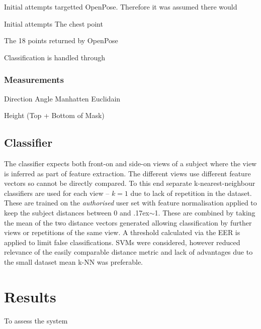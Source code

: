 \documentclass[conference]{IEEEtran} %
\newcommand{\mytilde}{\raise.17ex\hbox{$\scriptstyle\mathtt{\sim}$}}
\begin{document}
Initial attempts targetted OpenPose. Therefore it was assumed there would

Initial attempts 
The chest point 

The 18 points returned by OpenPose




Classification is handled through 

\subsubsection{Measurements}
Direction
Angle
Manhatten
Euclidain

Height (Top + Bottom of Mask)

\subsection{Classifier}
\noindent The classifier expects both front-on and side-on views of a subject where the view is inferred as part of feature extraction. The different views use different feature vectors so cannot be directly compared. To this end separate k-nearest-neighbour classifiers are used for each view -- $k=1$ due to lack of repetition in the dataset. These are trained on the \textit{authorised} user set with feature normalisation applied to keep the subject distances between 0 and \mytilde 1. These are combined by taking the mean of the two distance vectors generated allowing classification by further views or repetitions of the same view. A threshold calculated via the EER is applied to limit false classifications. SVMs were considered, however reduced relevance of the easily comparable distance metric and lack of advantages due to the small dataset mean k-NN was preferable.
\section{Results}
To assess the system 
\end{document}
